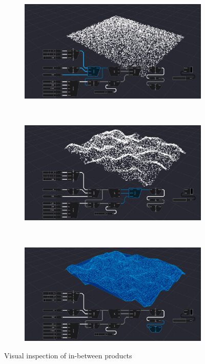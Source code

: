 \graphicspath{{../../assets/images/6/demo/}}

\begin{figure}
  \centering
  \begin{subfigure}[b]{0.90\linewidth}
    \centering
    \includegraphics[width=\linewidth]{products-1.PNG}
    \caption{}\label{fig:in-between-products:a}
  \end{subfigure}%
  \\ 
  \begin{subfigure}[b]{0.90\linewidth}
    \centering
    \includegraphics[width=\linewidth]{products-2.PNG}
    \caption{}\label{fig:in-between-products:b}
  \end{subfigure}%
  \\
  \begin{subfigure}[b]{0.90\linewidth}
    \centering
    \includegraphics[width=\linewidth]{products-3.PNG}
    \caption{}\label{fig:in-between-products:c}
  \end{subfigure}%
  \caption[]{Visual inspection of in-between products}%
  \label{fig:in-between-products}
\end{figure}

